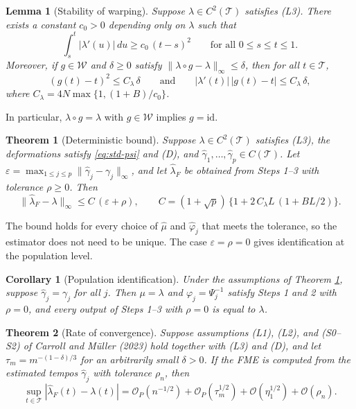 \documentclass[11pt]{article}
\newtheorem{theorem}{Theorem}
\newtheorem{lemma}{Lemma}
\newtheorem{corollary}{Corollary}
\newcommand{\T}{\mathcal{T}}
\newcommand{\W}{\mathcal{W}}
\newcommand{\lhat}{\hat{\lambda}}
\newcommand{\ghat}{\hat{\gamma}}
\newcommand{\muhat}{\hat{\mu}}
\newcommand{\phihat}{\hat{\varphi}}
\newcommand{\Op}{\mathcal{O}_P}
\newcommand{\id}{\mathrm{id}}
\newcommand{\sups}{\sup_{t \in \T}}
\newcommand{\norm}[1]{\|#1\|_\infty}
\begin{document}
\begin{lemma}[Stability of warping]
  \label{lem:stab}
  Suppose $\lambda \in C^2(\T)$ satisfies (L3). There exists a constant $c_0 > 0$ depending
  only on $\lambda$ such that
  \begin{equation}
    \int_s^t |\lambda'(u)|\,du \ge c_0\,(t-s)^2 \qquad \text{for all } 0 \le s \le t \le 1.
    \label{eq:quad}
  \end{equation}
  Moreover, if $g \in \W$ and $\delta \ge 0$ satisfy $\norm{\lambda\circ g - \lambda} \le \delta$,
  then for all $t \in \T$,
  \begin{equation}
    (g(t)-t)^2 \le C_\lambda\,\delta
    \qquad\text{and}\qquad
    |\lambda'(t)|\,|g(t)-t| \le C_\lambda\,\delta,
    \label{eq:stab}
  \end{equation}
  where $C_\lambda = 4N\max\{1, (1+B)/c_0\}$.
\end{lemma}

In particular, $\lambda \circ g = \lambda$ with $g \in \W$ implies $g = \id$.

\begin{theorem}[Deterministic bound]
  \label{thm:det}
  Suppose $\lambda \in C^2(\T)$ satisfies (L3), the deformations satisfy
  \eqref{eq:std-psi} and (D), and $\ghat_1,\ldots,\ghat_p \in C(\T)$. Let
  $\varepsilon = \max_{1\le j\le p}\norm{\ghat_j - \gamma_j}$, and let $\lhat_F$ be obtained
  from Steps 1--3 with tolerance $\rho \ge 0$. Then
  \begin{equation}
    \norm{\lhat_F - \lambda} \le C\,(\varepsilon + \rho),
    \qquad
    C = (1+\sqrt{p})\,\bigl\{1 + 2\,C_\lambda L\,(1 + BL/2)\bigr\}.
    \label{eq:det}
  \end{equation}
\end{theorem}

The bound holds for every choice of $\muhat$ and $\phihat_j$ that meets the tolerance, so
the estimator does not need to be unique. The case $\varepsilon = \rho = 0$ gives
identification at the population level.

\begin{corollary}[Population identification]
  \label{cor:pop}
  Under the assumptions of Theorem \ref{thm:det}, suppose $\ghat_j = \gamma_j$ for all $j$.
  Then $\mu = \lambda$ and $\varphi_j = \Psi_j^{-1}$ satisfy Steps 1 and 2 with $\rho = 0$, and
  every output of Steps 1--3 with $\rho = 0$ is equal to $\lambda$.
\end{corollary}

\begin{theorem}[Rate of convergence]
  \label{thm:rate}
  Suppose assumptions (L1), (L2), and (S0--S2) of Carroll and M\"{u}ller (2023) hold together
  with (L3) and (D), and let $\tau_m = m^{-(1-\delta)/3}$ for an arbitrarily small $\delta > 0$.
  If the FME is computed from the estimated tempos $\ghat_j$ with tolerance $\rho_n$, then
  \[
    \sups |\lhat_F(t) - \lambda(t)|
    = \Op(n^{-1/2}) + \Op(\tau_m^{1/2}) + \mathcal{O}(\eta_1^{1/2}) + \mathcal{O}(\rho_n).
  \]
\end{theorem}
\end{document}
